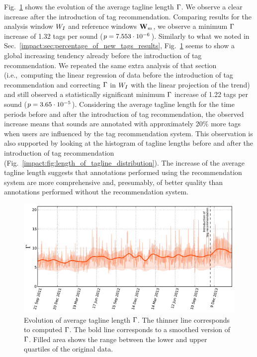 Fig.~\ref{impact:fig:length_of_tagline} shows the evolution of the average tagline length $\Gamma$. We observe a clear increase after the introduction of tag recommendation. Comparing results for the analysis window $W_I$ and reference windows $\mathbf{W}_m$, we observe a minimum $\Gamma$ increase of 1.32 tags per sound ($p = 7.553\cdot 10^{-6}$). 
Similarly to what we noted in Sec.~\ref{impact:sec:percentage_of_new_tags_results}, Fig.~\ref{impact:fig:length_of_tagline} seems to show a global increasing tendency already before the introduction of tag recommendation. We repeated the same extra analysis of that section (i.e.,~computing the linear regression of data before the introduction of tag recommendation and correcting $\Gamma$ in $W_I$ with the linear projection of the trend) and still observed a statistically significant minimum $\Gamma$ increase of 1.22 tags per sound ($p = 3.65\cdot 10^{-5}$). Considering the average tagline length for the time periods before and after the introduction of tag recommendation, the observed increase means that sounds are annotated with approximately 20\% more tags when users are influenced by the tag recommendation system. This observation is also supported by looking at the histogram of tagline lengths before and after the introduction of tag recommendation (Fig.~\ref{impact:fig:length_of_tagline_distribution}). The increase of the average tagline length suggests that annotations performed using the recommendation system are more comprehensive and, presumably, of better quality than annotations performed without the recommendation system. 

\begin{figure}
\centerline{\includegraphics[width=\figSizeMax]{ch05_impact/pics/fig09_length_of_tagline}}
\caption[Evolution of average tagline length]{Evolution of average tagline length $\Gamma$. The thinner line corresponds to computed $\Gamma$. The bold line corresponds to a smoothed version of $\Gamma$. Filled area shows the range between the lower and upper quartiles of the original data.}
\vspace{0.8cm}
\label{impact:fig:length_of_tagline}
\end{figure}

